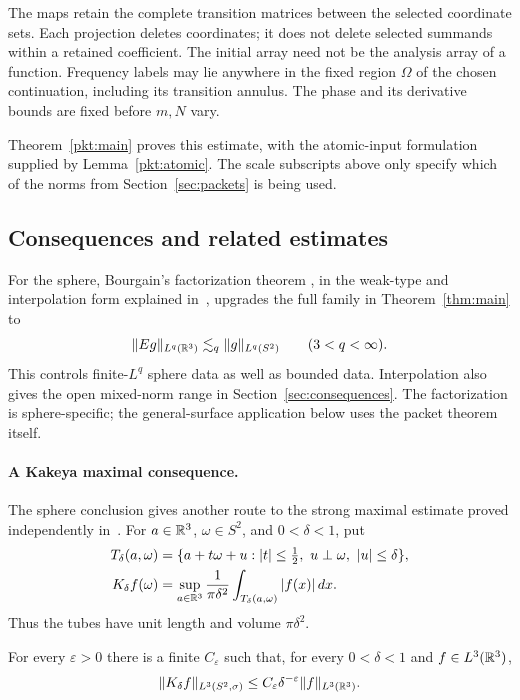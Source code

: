 The maps retain the complete transition matrices between the selected
coordinate sets.  Each projection deletes coordinates; it does not
delete selected summands within a retained coefficient.  The initial
array need not be the analysis array of a function.  Frequency labels
may lie anywhere in the fixed region \(\Omega\) of the chosen
continuation, including its transition annulus.  The phase and its
derivative bounds are fixed before \(m,N\) vary.

Theorem~\ref{pkt:main} proves this estimate, with the atomic-input
formulation supplied by Lemma~\ref{pkt:atomic}.  The scale subscripts
above only specify which of the norms from Section~\ref{sec:packets}
is being used.

\subsection{Consequences and related estimates}

For the sphere, Bourgain's factorization theorem
\cite{Bourgain1991Besicovitch}, in the weak-type and interpolation
form explained in~\cite[Section~1.1, (1.1)--(1.2)]{Buschenhenke2024},
upgrades the full family in Theorem~\ref{thm:main} to
\[
 \|Eg\|_{L^q(\mathbb R^3)}\lesssim_q\|g\|_{L^q(S^2)}
 \qquad(3<q<\infty).
\]
This controls finite-$L^q$ sphere data as well as bounded data.
Interpolation also gives the open mixed-norm range in
Section~\ref{sec:consequences}.
The factorization is sphere-specific; the general-surface application
below uses the packet theorem itself.

\paragraph{A Kakeya maximal consequence.}
The sphere conclusion gives another route to the strong maximal estimate
proved independently in~\cite[Theorem~1.1]{OpenAIKakeya2026}.
For \(a\in\mathbb R^3\), \(\omega\in S^2\), and \(0<\delta<1\), put
\begin{align*}
 T_\delta(a,\omega)
 &=\{a+t\omega+u:|t|\le\tfrac12,\ u\perp\omega,\ |u|\le\delta\},\\
 K_\delta f(\omega)
 &=\sup_{a\in\mathbb R^3}\frac1{\pi\delta^2}
                  \int_{T_\delta(a,\omega)}|f(x)|\,dx.
\end{align*}
Thus the tubes have unit length and volume \(\pi\delta^2\).

\begin{corollary}\label{cor:sphere-kakeya-maximal}
For every \(\varepsilon>0\) there is a finite \(C_\varepsilon\) such that,
for every \(0<\delta<1\) and \(f\in L^3(\mathbb R^3)\),
\[
 \|K_\delta f\|_{L^3(S^2,\sigma)}
 \le C_\varepsilon\delta^{-\varepsilon}\|f\|_{L^3(\mathbb R^3)}.
\]
\end{corollary}


